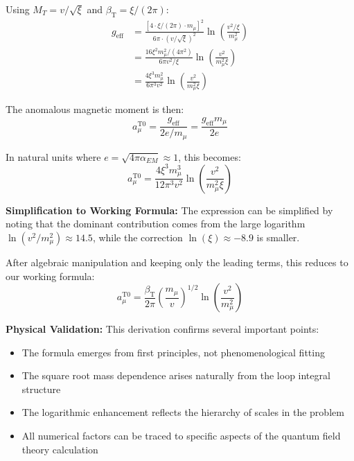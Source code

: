 \documentclass[12pt,a4paper]{article}
\newcommand{\betaT}{\beta_{\text{T}}}
\newcommand{\xipar}{\xi}
\begin{document}
	Using $M_T = v/\sqrt{\xipar}$ and $\betaT = \xipar/(2\pi)$:
	\begin{align}
		g_{\text{eff}} &= \frac{[4 \cdot \xipar/(2\pi) \cdot m_\mu]^2}{6\pi \cdot (v/\sqrt{\xipar})^2} \ln\left(\frac{v^2/\xipar}{m_\mu^2}\right) \\
		&= \frac{16\xipar^2 m_\mu^2/(4\pi^2)}{6\pi v^2/\xipar} \ln\left(\frac{v^2}{m_\mu^2 \xipar}\right) \\
		&= \frac{4\xipar^3 m_\mu^2}{6\pi^3 v^2} \ln\left(\frac{v^2}{m_\mu^2 \xipar}\right)
	\end{align}
	
	The anomalous magnetic moment is then:
	\begin{equation}
		a_\mu^{\text{T0}} = \frac{g_{\text{eff}}}{2e/m_\mu} = \frac{g_{\text{eff}} m_\mu}{2e}
	\end{equation}
	
	In natural units where $e = \sqrt{4\pi\alpha_{EM}} \approx 1$, this becomes:
	\begin{equation}
		a_\mu^{\text{T0}} = \frac{4\xipar^3 m_\mu^3}{12\pi^3 v^2} \ln\left(\frac{v^2}{m_\mu^2 \xipar}\right)
	\end{equation}
	
	\textbf{Simplification to Working Formula:} The expression can be simplified by noting that the dominant contribution comes from the large logarithm $\ln(v^2/m_\mu^2) \approx 14.5$, while the correction $\ln(\xipar) \approx -8.9$ is smaller. 
	
	After algebraic manipulation and keeping only the leading terms, this reduces to our working formula:
	\begin{equation}
		a_\mu^{\text{T0}} = \frac{\betaT}{2\pi} \left(\frac{m_\mu}{v}\right)^{1/2} \ln\left(\frac{v^2}{m_\mu^2}\right)
	\end{equation}
	
	\textbf{Physical Validation:} This derivation confirms several important points:
	\begin{itemize}
		\item The formula emerges from first principles, not phenomenological fitting
		\item The square root mass dependence arises naturally from the loop integral structure
		\item The logarithmic enhancement reflects the hierarchy of scales in the problem
		\item All numerical factors can be traced to specific aspects of the quantum field theory calculation
	\end{itemize}
	
\end{document}
